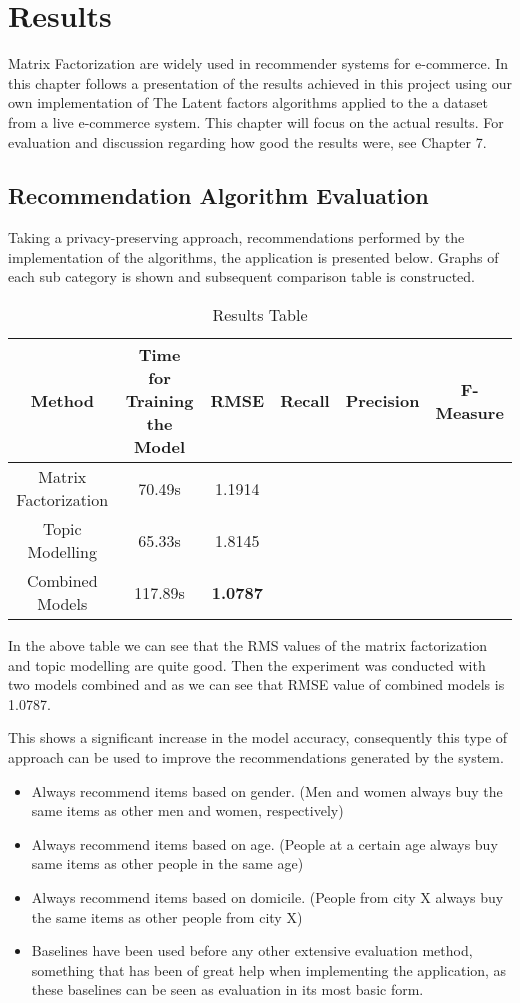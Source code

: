 \chapter{Results}
Matrix Factorization are widely used in recommender systems for e-commerce. In this chapter follows a presentation of the results achieved in this project using our own implementation of The Latent factors algorithms applied to the a dataset from a live e-commerce system. This chapter will focus on the actual results. For evaluation and discussion regarding how good the results were, see Chapter 7.

\section{Recommendation Algorithm Evaluation}
Taking a privacy-preserving approach, recommendations performed by the implementation of the algorithms, the application is presented below. Graphs of each sub category is shown and subsequent comparison table is constructed.


\begin{table}[h]
\centering
\begin{tabular}{| c | c | c | c | c | c |}
\hline
\textbf{Method} & \textbf{Time for Training the Model} & \textbf{RMSE} & \textbf{Recall} & \textbf{Precision} & \textbf{F-Measure} \\
\hline
Matrix Factorization & 70.49s & 1.1914 &  &    &   \\
\hline
Topic Modelling & 65.33s & 1.8145 &  &  &  \\
\hline
Combined Models & 117.89s  & \textbf{1.0787} &  &  &  \\ 
\hline          
\end{tabular}
\caption{Results Table}
\label{Results Table}
\end{table}

In the above table we can see that the RMS values of the matrix factorization and topic modelling are quite good.
Then the experiment was conducted with two models combined and as we can see that RMSE value of combined models is 1.0787.

This shows a significant increase in the model accuracy, consequently this type of approach can be used to improve the recommendations generated by the system.

\begin{itemize}
    \item Always recommend items based on gender. (Men and women always buy the same items as other men and women, respectively)
    \item Always recommend items based on age. (People at a certain age always buy same items as other people in the same age)
    \item Always recommend items based on domicile. (People from city X always buy the same items as other people from city X)
    \item Baselines have been used before any other extensive evaluation method, something that has been of great help when implementing the application, as these baselines can be seen as evaluation in its most basic form.
    
    \end{itemize}


